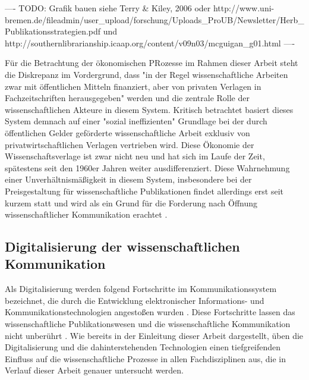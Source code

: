 ---- TODO: Grafik bauen siehe Terry & Kiley, 2006 oder http://www.uni-bremen.de/fileadmin/user_upload/forschung/Uploads_ProUB/Newsletter/Herb_Publikationsstrategien.pdf und http://southernlibrarianship.icaap.org/content/v09n03/mcguigan_g01.html ----

Für die Betrachtung der ökonomischen PRozesse im Rahmen dieser Arbeit steht die Diskrepanz im Vordergrund, dass "in der Regel wissenschaftliche Arbeiten zwar mit öffentlichen Mitteln finanziert, aber von privaten Verlagen in Fachzeitschriften herausgegeben" werden \cite[:9]{WD_bundestag_2009} \cite[:2]{Reichert_2009} und die zentrale Rolle der wissenschaftlichen Akteure in diesem System. Kritisch betrachtet basiert dieses System demnach auf einer "sozial ineffizienten" Grundlage \cite[:47]{mueller-langer_2010} bei der durch öffentlichen Gelder geförderte wissenschaftliche Arbeit exklusiv von privatwirtschaftlichen Verlagen vertrieben wird. Diese Ökonomie der Wissenschaftsverlage ist zwar nicht neu und hat sich im Laufe der Zeit, spätestens seit den 1960er Jahren weiter ausdifferenziert. Diese Wahrnehmung einer Unverhältnismäßigkeit in diesem System, insbesondere bei der Preisgestaltung für wissenschaftliche Publikationen \cite{King_2008} findet allerdings erst seit kurzem statt \cite{CREATe_2014} und wird als ein Grund für die Forderung nach Öffnung wissenschaftlicher Kommunikation erachtet \cite{yiotis_2013_open} \cite{herb_2010}.

\subsection{Digitalisierung der wissenschaftlichen Kommunikation}

Als Digitalisierung werden folgend Fortschritte im Kommunikationssystem bezeichnet, die durch die Entwicklung elektronischer Informations- und Kommunikationstechnologien angestoßen wurden \cite{bbaw_publizieren_2015}. Diese Fortschritte lassen das wissenschaftliche Publikationswesen und die wissenschaftliche Kommunikation nicht unberührt \cite{naeder_2010_open}. Wie bereits in der Einleitung dieser Arbeit dargestellt, üben die Digitalisierung und die dahinterstehenden Technologien einen tiefgreifenden Einfluss auf die wissenschaftliche Prozesse in allen Fachdisziplinen aus, die in Verlauf dieser Arbeit genauer untersucht werden.

